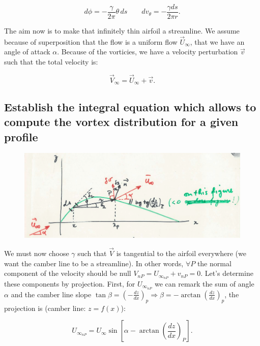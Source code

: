 \documentclass[british,french,11pt, a4paper, openany]{article}
\begin{document}
\begin{equation}
d\phi = -\frac{\gamma}{2\pi} \theta \, ds \qquad dv_\theta = -\frac{\gamma ds}{2\pi r}.
\end{equation}

The aim now is to make that infinitely thin airfoil a streamline. We assume because of superposition that the flow is a uniform flow $\vec{U}_\infty$, that we have an angle of attack $\alpha$. Because of the vorticies, we have a velocity perturbation $\vec{v}$ such that the total velocity is: 

\begin{equation}
\vec{V}_\infty = \vec{U}_\infty + \vec{v}.
\end{equation}

\subsection{Establish the integral equation which allows to compute the vortex
	distribution for a given profile}

\begin{figure}
	\vspace{-5mm}
	\includegraphics[scale=0.1]{ch2/33}
\end{figure}
We must now choose $\gamma$ such that $\vec{V}$ is tangential to the airfoil everywhere (we want the camber line to be a streamline). In other words, $\forall P$ the normal component of the velocity should be null $V_{nP} = U_{\infty _{nP}} + v_{nP} = 0$. Let's determine these components by projection. First, for $U_{\infty _{nP}}$ we can remark the sum of angle $\alpha$ and the camber line slope $\tan \beta =  \left(-\frac{dz}{dx}\right)_p \Rightarrow \beta = -\arctan \left(\frac{dz}{dx}\right)_p$, the projection is (camber line: $z = f(x)$):

\begin{equation}
U_{\infty _{nP}} = U_\infty \sin \left[ \alpha - \arctan \left(\frac{dz}{dx} \right)_P \right].
\label{eq:2.54}
\end{equation}	 
\end{document}
